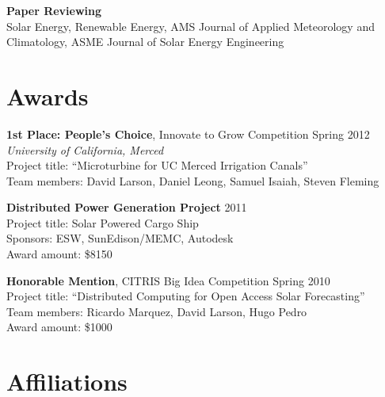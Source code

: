 \documentclass[]{res}
\begin{document}
\begin{resume}
\textbf{Paper Reviewing} \\
Solar Energy, Renewable Energy, AMS Journal of Applied Meteorology and
Climatology, ASME Journal of Solar Energy Engineering


%
\section{Awards}
\vspace{0.1in}

\textbf{1st Place: People's Choice}, Innovate to Grow Competition \hfill Spring 2012 \\
\textit{University of California, Merced} \\
Project title: ``Microturbine for UC Merced Irrigation Canals'' \\
Team members: David Larson, Daniel Leong, Samuel Isaiah, Steven Fleming

\textbf{Distributed Power Generation Project} \hfill 2011 \\
Project title: Solar Powered Cargo Ship \\
Sponsors: ESW, SunEdison/MEMC, Autodesk \\
Award amount: \$8150

\textbf{Honorable Mention}, CITRIS Big Idea Competition \hfill Spring 2010 \\
Project title: ``Distributed Computing for Open Access Solar Forecasting'' \\
Team members: Ricardo Marquez, David Larson, Hugo Pedro \\
Award amount: \$1000



\section{Affiliations}
\vspace{0.1in}


\end{resume}
\end{document}

